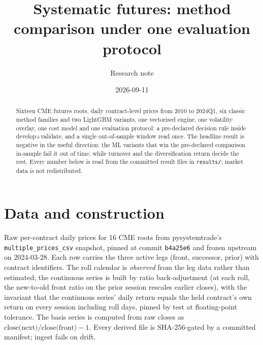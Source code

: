\documentclass[11pt,a4paper]{article}
\title{Systematic futures: method comparison under one evaluation protocol}
\author{Research note}
\date{2026-09-11}
\begin{document}
\maketitle

\begin{abstract}
Sixteen CME futures roots, daily contract-level prices from 2010 to 2024Q1, six classic method
families and two LightGBM variants, one vectorised engine, one volatility overlay, one cost model and
one evaluation protocol: a pre-declared decision rule inside develop+validate, and a single
out-of-sample window read once. The headline result is negative in the useful direction: the ML
variants that win the pre-declared comparison in-sample fail it out of time, while turnover and the
diversification return decide the rest. Every number below is read from the committed result files in
\texttt{results/}; market data is not redistributed.
\end{abstract}

\section{Data and construction}
Raw per-contract daily prices for 16 CME roots from pysystemtrade's \texttt{multiple\_prices\_csv}
snapshot, pinned at commit \texttt{b4a25e6} and frozen upstream on 2024-03-28. Each row carries the
three active legs (front, successor, prior) with contract identifiers. The roll calendar is
\emph{observed} from the leg data rather than estimated; the continuous series is built by ratio
back-adjustment (at each roll, the new-to-old front ratio on the prior session rescales earlier
closes), with the invariant that the continuous series' daily return equals the held contract's own
return on every session including roll days, pinned by test at floating-point tolerance. The basis
series is computed from raw closes as $\text{close(next)}/\text{close(front)}-1$. Every derived file
is SHA-256-gated by a committed manifest; ingest fails on drift.
\end{document}
